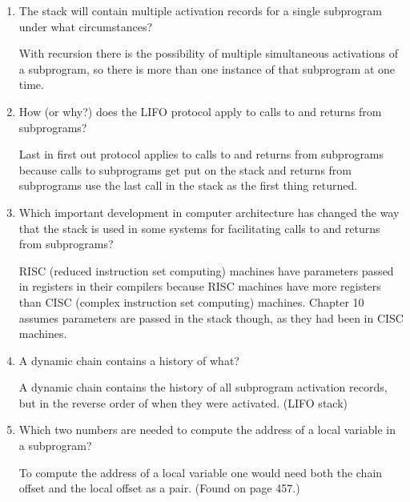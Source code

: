 \begin{enumerate}
  \item The stack will contain multiple activation
    records for a single subprogram under what
    circumstances?

  \begin{answer}
    With recursion there is the possibility of multiple simultaneous activations of a subprogram, so there is more than one instance of that subprogram at one time.
  \end{answer}

  \item How (or why?) does the LIFO protocol apply to
    calls to and returns from subprograms?

  \begin{answer}
    Last in first out protocol applies to calls to and returns from subprograms because calls to subprograms get put on the stack and returns from subprograms use the last call in the stack as the first thing returned. 
  \end{answer}

  \item Which important development in computer architecture
    has changed the way that the stack is used in some
    systems for facilitating calls to and returns from
    subprograms?

  \begin{answer}
    RISC (reduced instruction set computing) machines have parameters passed in registers in their compilers because RISC machines have more registers than CISC (complex instruction set computing) machines. Chapter 10 assumes parameters are passed in the stack though, as they had been in CISC machines.
  \end{answer}

  \item A dynamic chain contains a history of what?

  \begin{answer}
    A dynamic chain contains the history of all subprogram activation records, but in the reverse order of when they were activated. (LIFO stack)
  \end{answer}

  \item Which two numbers are needed to compute
    the address of a local variable in a subprogram?

  \begin{answer}
    To compute the address of a local variable one would need both the chain offset and the local offset as a pair. (Found on page 457.)
  \end{answer}


\end{enumerate}
